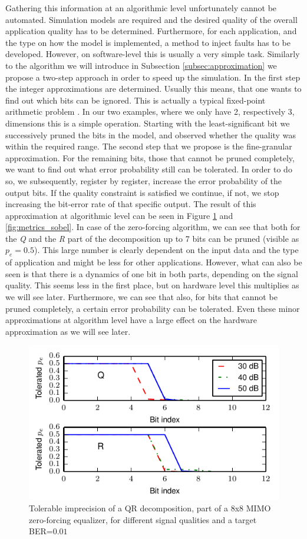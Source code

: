 \documentclass[conference]{IEEEtran}
\begin{document}
Gathering this information at an algorithmic level unfortunately cannot be automated. Simulation models are required and the desired quality of the overall application quality has to be determined. Furthermore, for each application, and the type on how the model is implemented, a method to inject faults has to be developed. However, on software-level this is usually a very simple task. Similarly to the algorithm we will introduce in Subsection \ref{subsec:approximation} we propose a two-step approach in order to speed up the simulation. In the first step the integer approximations are determined. Usually this means, that one wants to find out which bits can be ignored. This is actually a typical fixed-point arithmetic problem \cite{yates2009fixed}. In our two examples, where we only have 2, respectively 3, dimensions this is a simple operation. Starting with the least-significant bit we successively pruned the bits in the model, and observed whether the quality was within the required range. The second step that we propose is the fine-granular approximation. For the remaining bits, those that cannot be pruned completely, we want to find out what error probability still can be tolerated. In order to do so, we subsequently, register by register, increase the error probability of the output bits. If the quality constraint is satisfied we continue, if not, we stop increasing the bit-error rate of that specific output. The result of this approximation at algorithmic level can be seen in Figure \ref{fig:metrics_qr} and \ref{fig:metrics_sobel}. In case of the zero-forcing algorithm, we can see that both for the \emph{Q} and the \emph{R} part of the decomposition up to 7 bits can be pruned (visible as $p_e=0.5$). This large number is clearly dependent on the input data and the type of application and might be less for other applications. However, what can also be seen is that there is a dynamics of one bit in both parts, depending on the signal quality. This seems less in the first place, but on hardware level this multiplies as we will see later. Furthermore, we can see that also, for bits that cannot be pruned completely, a certain error probability can be tolerated. Even these minor approximations at algorithm level have a large effect on the hardware approximation as we will see later.
\begin{figure}[tb]
  \centering
  \includegraphics[width=.5\textwidth]{figs/metrics_qr}
  \caption{Tolerable imprecision of a QR decomposition, part of a 8x8 MIMO zero-forcing equalizer, for different signal qualities and a target BER=$0.01$}
  \label{fig:metrics_qr}
\end{figure}
\end{document}
